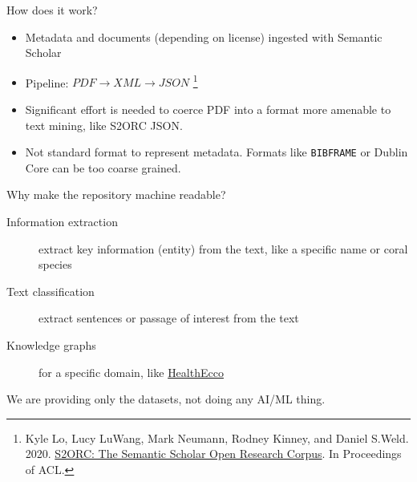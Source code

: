 \documentclass[aspectratio=169]{beamer}
\begin{document}
\begin{frame}{How does it work?}
    \begin{itemize}
        \item Metadata and documents (depending on license) ingested with Semantic Scholar
        \item Pipeline: $PDF \rightarrow XML \rightarrow JSON$ \footnote{Kyle Lo, Lucy LuWang, Mark Neumann, Rodney Kinney, and Daniel S.Weld. 2020. \href{https://arxiv.org/abs/1911.02782}{S2ORC: The Semantic Scholar Open Research Corpus}. In Proceedings of ACL.}
    \end{itemize}
    \begin{tcolorbox}[colback=red!5!white,colframe=red!75!black,title=Challenges]
        \begin{itemize}
            \item Significant effort is needed to coerce PDF into a format more amenable to text mining, like S2ORC JSON.
            \item Not standard format to represent metadata. Formats like \texttt{BIBFRAME} or Dublin Core can be too coarse grained.
        \end{itemize}
    \end{tcolorbox}
    
\end{frame}

\begin{frame}{Why make the repository machine readable?}
    \begin{description}
        \item [Information extraction] extract key information (entity) from the text, like a specific name or coral species
        \item [Text classification] extract sentences or passage of interest from the text
        \item [Knowledge graphs] for a specific domain, like \href{https://healthecco.org/covidgraph/}{HealthEcco}
    \end{description}

    \begin{tcolorbox}[title=Disclaimer]
        We are providing only the datasets, not doing any AI/ML thing.        
    \end{tcolorbox}

\end{frame}
\end{document}
